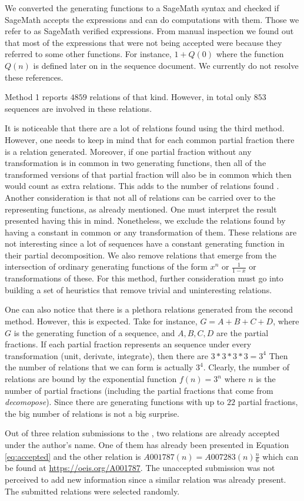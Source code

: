 We converted the generating functions to a SageMath syntax and checked if SageMath accepts the expressions and can do
 computations with them. Those we refer to as SageMath verified expressions. From manual inspection we found out that
  most of the expressions that were not being accepted were because they referred to some other functions. For
  instance, $1+Q(0)$ where the function $Q(n)$ is defined later on in the sequence document. We currently do not
  resolve these references.

Method 1 reports $4859$ relations of that kind. However, in total only $853$ sequences are involved in these relations.

It is noticeable that there are a lot of relations found using the third method. However, one needs to keep in mind
that for each common partial fraction there is a relation generated. Moreover, if one partial fraction without any
transformation is in common in two generating functions, then all of the transformed versions of that partial
fraction will also be in common which then would count as extra relations. This adds to the number of relations found
. Another consideration is that not all of relations can be carried over to the representing functions, as already
mentioned. One must interpret the result presented having this in mind. Nonetheless, we exclude the relations found
by having a constant in common or any transformation of them. These relations are not interesting since a lot of
sequences have a constant generating function in their partial decomposition. We also remove relations that emerge
from the intersection of ordinary generating functions of the form $x^n$ or $\frac{1}{1-x}$ or transformations of
these. For this method, further consideration must go into building a set of heuristics that remove trivial and
uninteresting relations.

One can also notice that there is a plethora relations generated from the second method. However, this is expected.
Take for instance, $G = A + B + C + D$, where $G$ is the generating function of a sequence, and $A,B,C, D$ are the
partial fractions. If each partial fraction represents an \oeis sequence under every transformation (unit, derivate,
integrate), then there are $3*3*3*3=3^4$ Then the number of relations that we can form is actually $3^4$. Clearly,
the number of relations are bound by the exponential function $f(n) = 3^n$ where $n$ is the number of partial
fractions (including the partial fractions that come from \emph{decomopose}). Since there are generating functions
with up to $22$ partial fractions, the big number of relations is not a big surprise.

Out of three relation submissions to the \oeis, two relations are already accepted
\cite{oeis-accepted-1} \cite{oeis-accepted-2} under the author's
name. One of
them has already been presented in Equation \ref{eq:accepted} and the other relation is $A001787(n) = A007283(n)
\frac{n}{6}$ which can be found at \url{https://oeis.org/A001787}. The unaccepted submission was not perceived to add
 new information since a similar relation was already present. The submitted relations were selected randomly.

